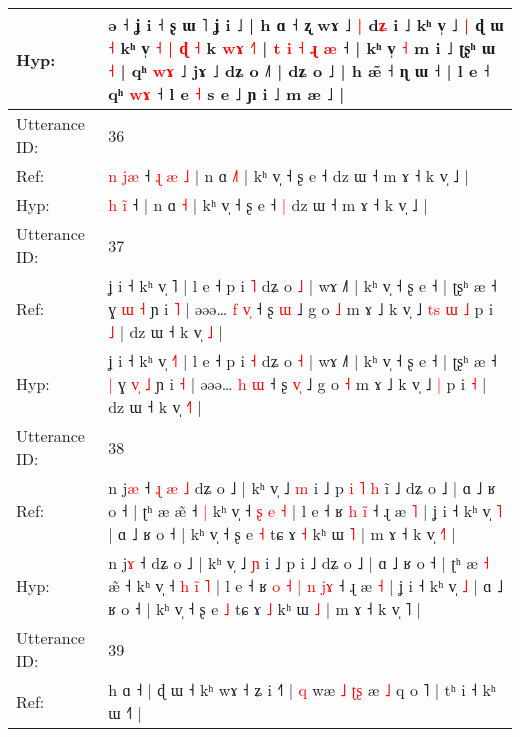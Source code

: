 \documentclass[10pt]{article}
\DeclareRobustCommand{\hl}[1]{{\textcolor{red}{#1}}}
\begin{document}
\begin{longtable}{ll}
 \\
Hyp: & ə ˧ ʝ i ˧ ʂ ɯ ˥ ʝ i ˩ | h ɑ ˧ ʐ wɤ ˩\hl{ }\hl{|} d\hl{ʑ} i ˩ kʰ v̩ ˩\hl{ }\hl{|} ɖ ɯ \hl{˧} kʰ v̩ \hl{˧} \hl{|} \hl{ɖ} \hl{˧} k\hl{} \hl{w}\hl{ɤ} \hl{˧}\hl{˥} | \hl{t}\hl{ }\hl{i} \hl{˧} \hl{ɻ}\hl{ }\hl{æ} ˧ | kʰ v̩ \hl{˧} m i ˩ ʈʂʰ ɯ \hl{˧} | qʰ \hl{w}\hl{ɤ} ˩ jɤ ˩ dʑ o ˩˥ | dʑ o ˩ | h æ\hl{̃} ˧ ɳ ɯ ˧ | l e ˧ qʰ \hl{w}\hl{ɤ} ˧ l e \hl{˧} s e ˩ ɲ i ˩ m æ ˩ |
 \\
\midrule
Utterance ID: & 36 \\
Ref: & \hl{n} \hl{j}\hl{æ} ˧\hl{ }\hl{ɻ}\hl{ }\hl{æ}\hl{ }\hl{˩} | n ɑ \hl{˩}\hl{˥} | kʰ v̩ ˧ ʂ e ˧\hl{}\hl{} dz ɯ ˧ m ɤ ˧ k v̩ ˩ |
 \\
Hyp: & \hl{h} \hl{i}\hl{̃} ˧\hl{}\hl{}\hl{}\hl{}\hl{}\hl{} | n ɑ \hl{}\hl{˧} | kʰ v̩ ˧ ʂ e ˧\hl{ }\hl{|} dz ɯ ˧ m ɤ ˧ k v̩ ˩ |
 \\
\midrule
Utterance ID: & 37 \\
Ref: & ʝ i ˧ kʰ v̩ \hl{}˥ | l e ˧ p i \hl{˥} dʑ o \hl{˩} | wɤ ˩˥ | kʰ v̩ ˧ ʂ e ˧ | ʈʂʰ æ ˧\hl{}\hl{} ɣ \hl{}\hl{ɯ} \hl{˧} ɲ i \hl{˥} | əəə… \hl{f} \hl{v}\hl{̩} ˧ ʂ \hl{}\hl{ɯ} ˩ g o \hl{˩} m ɤ ˩ k v̩ ˩\hl{ }\hl{t}\hl{s}\hl{ }\hl{ɯ} \hl{˩} p i \hl{˩} | dz ɯ ˧ k v̩ \hl{}\hl{˩} |
 \\
Hyp: & ʝ i ˧ kʰ v̩ \hl{˧}˥ | l e ˧ p i \hl{˧} dʑ o \hl{˧} | wɤ ˩˥ | kʰ v̩ ˧ ʂ e ˧ | ʈʂʰ æ ˧\hl{ }\hl{|} ɣ \hl{v}\hl{̩} \hl{˩} ɲ i \hl{˧} | əəə… \hl{h} \hl{}\hl{ɯ} ˧ ʂ \hl{v}\hl{̩} ˩ g o \hl{˧} m ɤ ˩ k v̩ ˩\hl{}\hl{}\hl{}\hl{}\hl{} \hl{|} p i \hl{˧} | dz ɯ ˧ k v̩ \hl{˧}\hl{˥} |
 \\
\midrule
Utterance ID: & 38 \\
Ref: & n j\hl{æ} ˧\hl{ }\hl{ɻ}\hl{ }\hl{æ}\hl{ }\hl{˩} dʑ o ˩ | kʰ v̩ ˩ \hl{m} i ˩ p\hl{ }\hl{i}\hl{ }\hl{˥}\hl{ }\hl{h} i\hl{̃} ˩ dʑ o ˩ | ɑ ˩ ʁ o ˧ | ʈʰ æ\hl{}\hl{} æ̃ ˧\hl{ }\hl{|} kʰ v̩ ˧ \hl{ʂ} \hl{}\hl{e} \hl{˧} | l e ˧ ʁ\hl{}\hl{}\hl{}\hl{}\hl{}\hl{} \hl{h} \hl{i}\hl{̃} ˧ ɻ æ \hl{˥} | ʝ i ˧ kʰ v̩ \hl{˥} | ɑ ˩ ʁ o ˧ | kʰ v̩ ˧ ʂ e \hl{˧} tɕ ɤ \hl{˧} kʰ ɯ \hl{˥} | m ɤ ˧ k v̩ \hl{˧}˥ |
 \\
Hyp: & n j\hl{ɤ} ˧\hl{}\hl{}\hl{}\hl{}\hl{}\hl{} dʑ o ˩ | kʰ v̩ ˩ \hl{ɲ} i ˩ p\hl{}\hl{}\hl{}\hl{}\hl{}\hl{} i\hl{} ˩ dʑ o ˩ | ɑ ˩ ʁ o ˧ | ʈʰ æ\hl{ }\hl{˧} æ̃ ˧\hl{}\hl{} kʰ v̩ ˧ \hl{h} \hl{i}\hl{̃} \hl{˥} | l e ˧ ʁ\hl{ }\hl{o}\hl{ }\hl{˧}\hl{ }\hl{|} \hl{n} \hl{j}\hl{ɤ} ˧ ɻ æ \hl{˧} | ʝ i ˧ kʰ v̩ \hl{˩} | ɑ ˩ ʁ o ˧ | kʰ v̩ ˧ ʂ e \hl{˩} tɕ ɤ \hl{˩} kʰ ɯ \hl{˩} | m ɤ ˧ k v̩ \hl{}˥ |
 \\
\midrule
Utterance ID: & 39 \\
Ref: & h ɑ ˧ | ɖ ɯ ˧ kʰ wɤ ˧ ʑ i ˧˥ |\hl{ }\hl{q} wæ \hl{˩} \hl{ʈ}\hl{ʂ} æ \hl{˩} q o ˥ | tʰ i ˧ kʰ ɯ ˧˥ |

\end{longtable}
\end{document}
